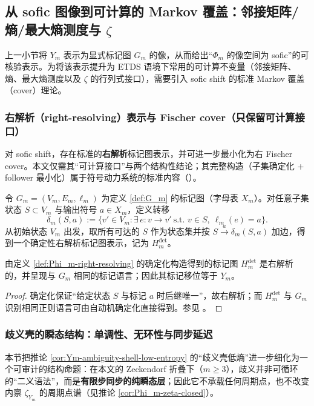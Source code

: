 \subsection{从 sofic 图像到可计算的 Markov 覆盖：邻接矩阵/熵/最大熵测度与 \texorpdfstring{$\zeta$}{zeta}}\label{subsec:Phi_m-fischer}
上一小节将 $Y_m$ 表示为显式标记图 $G_m$ 的像，从而给出“$\Phi_m$ 的像空间为 sofic”的可核验表示。为将该表示提升为 ETDS 语境下常用的可计算不变量（邻接矩阵、熵、最大熵测度以及 \(\zeta\) 的行列式接口），需要引入 sofic shift 的标准 Markov 覆盖（cover）理论。

\subsubsection{右解析（right-resolving）表示与 Fischer cover（只保留可计算接口）}
对 sofic shift，存在标准的\textbf{右解析}标记图表示，并可进一步最小化为右 Fischer cover。本文仅需其“可计算接口”与两个结构性结论；其完整构造（子集确定化 + follower 最小化）属于符号动力系统的标准内容（\cite{LindMarcus1995,Kitchens1998SymbolicDynamics}）。

\begin{definition}[右解析表示的确定化口径]\label{def:Phi_m-right-resolving}
令 $G_m=(V_m,E_m,\ell_m)$ 为定义 \ref{def:G_m} 的标记图（字母表 $X_m$）。对任意子集状态 $S\subset V_m$ 与输出符号 $a\in X_m$，定义转移
\[
\delta_m(S,a):=\{v'\in V_m:\exists\,e:v\to v'\ \text{s.t. } v\in S,\ \ell_m(e)=a\}.
\]
从初始状态 $V_m$ 出发，取所有可达的 $S$ 作为状态集并按 $S\xrightarrow{a}\delta_m(S,a)$ 加边，得到一个确定性右解析标记图表示，记为 $H_m^{\mathrm{det}}$。
\end{definition}

\begin{proposition}[右解析表示的存在与等价]\label{prop:Phi_m-right-resolving}
由定义 \ref{def:Phi_m-right-resolving} 的确定化构造得到的标记图 $H_m^{\mathrm{det}}$ 是右解析的，并呈现与 $G_m$ 相同的标记语言；因此其标记移位等于 $Y_m$。
\end{proposition}

\begin{proof}
确定化保证“给定状态 $S$ 与标记 $a$ 时后继唯一”，故右解析；而 $H_m^{\mathrm{det}}$ 与 $G_m$ 识别相同正则语言可由自动机确定化直接得到。参见 \cite{LindMarcus1995,Kitchens1998SymbolicDynamics}。
\end{proof}

\subsubsection{歧义壳的瞬态结构：单调性、无环性与同步延迟}\label{subsec:Ym-amb-transient}
本节把推论 \ref{cor:Ym-ambiguity-shell-low-entropy} 的“歧义壳低熵”进一步细化为一个可审计的结构命题：在本文的 Zeckendorf 折叠下（$m\ge 3$），歧义并非可循环的“二义语法”，而是\textbf{有限步同步的纯瞬态层}；因此它不承载任何周期点，也不改变内禀 \(\zeta_{Y_m}\) 的周期点谱（见推论 \ref{cor:Phi_m-zeta-closed}）。

